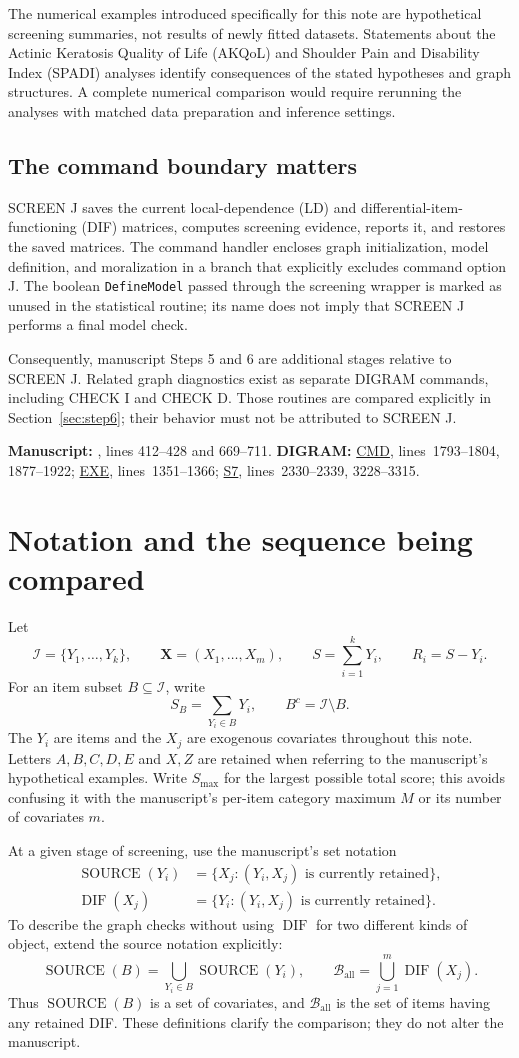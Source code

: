 \documentclass[11pt,a4paper]{article}
\newcommand{\SRC}{\operatorname{SOURCE}}
\newcommand{\DIF}{\operatorname{DIF}}
\newcommand{\Iset}{\mathcal{I}}
\newcommand{\src}[2]{\hyperlink{source-#1}{\textsf{#1}}, lines~#2}
\newcommand{\trace}[2]{%
  \par\smallskip
  {\footnotesize\color{tracegray}\textbf{Manuscript:} #1.\quad
  \textbf{DIGRAM:} #2.\par}\medskip}
\begin{document}
The numerical examples introduced specifically for this note are hypothetical
screening summaries, not results of newly fitted datasets. Statements about
the Actinic Keratosis Quality of Life (AKQoL) and Shoulder Pain and Disability
Index (SPADI) analyses identify consequences of the stated hypotheses
and graph structures. A complete numerical comparison would require rerunning
the analyses with matched data preparation and inference settings.

\subsection{The command boundary matters}
SCREEN J saves the current local-dependence (LD) and differential-item-functioning
(DIF) matrices, computes screening evidence, reports it, and restores the saved
matrices. The command handler encloses graph initialization, model definition,
and moralization in a branch that explicitly excludes command option J.
The boolean \texttt{DefineModel} passed through the screening wrapper is marked
as unused in the statistical routine; its name does not imply that SCREEN J
performs a final model check.

Consequently, manuscript Steps 5 and 6 are additional stages relative to
SCREEN J. Related graph diagnostics exist as separate DIGRAM commands,
including CHECK I and CHECK D. Those routines are compared explicitly in
Section~\ref{sec:step6}; their behavior must not be attributed to SCREEN J.
\trace{, lines 412--428 and 669--711}
{\src{CMD}{1793--1804, 1877--1922}; \src{EXE}{1351--1366};
 \src{S7}{2330--2339, 3228--3315}}

\section{Notation and the sequence being compared}
\label{sec:notation}
Let
\[
 \Iset=\{Y_1,\ldots,Y_k\},\qquad
 \boldsymbol X=(X_1,\ldots,X_m),\qquad
 S=\sum_{i=1}^kY_i,\qquad R_i=S-Y_i .
\]
For an item subset \(B\subseteq\Iset\), write
\[
 S_B=\sum_{Y_i\in B}Y_i,\qquad B^c=\Iset\setminus B .
\]
The \(Y_i\) are items and the \(X_j\) are exogenous covariates throughout this
note. Letters \(A,B,C,D,E\) and \(X,Z\) are retained when referring to the
manuscript's hypothetical examples. Write \(S_{\max}\) for the largest possible
total score; this avoids confusing it with the manuscript's per-item category
maximum \(M\) or its number of covariates \(m\).

At a given stage of screening, use the manuscript's set notation
\begin{align*}
 \SRC(Y_i)&=\{X_j:(Y_i,X_j)\text{ is currently retained}\},\\
 \DIF(X_j)&=\{Y_i:(Y_i,X_j)\text{ is currently retained}\}.
\end{align*}
To describe the graph checks without using \(\DIF\) for two different kinds
of object, extend the source notation explicitly:
\[
 \SRC(B)=\bigcup_{Y_i\in B}\SRC(Y_i),\qquad
 \mathcal B_{\mathrm{all}}=\bigcup_{j=1}^m\DIF(X_j).
\]
Thus \(\SRC(B)\) is a set of covariates, and
\(\mathcal B_{\mathrm{all}}\) is the set of items having any retained DIF.
These definitions clarify the comparison; they do not alter the manuscript.
\end{document}
